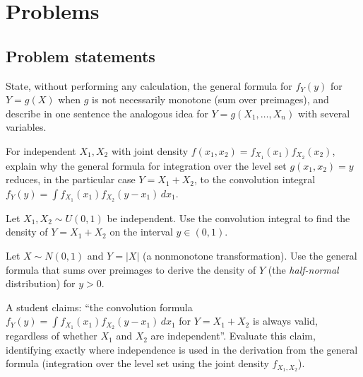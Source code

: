 \section*{Problems}

\subsection*{Problem statements}

\begin{problema}
	\label{prob:0b1575d}
	State, without performing any calculation, the general formula for $f_Y(y)$ for $Y=g(X)$ when $g$ is not necessarily monotone (sum over preimages), and describe in one sentence the analogous idea for $Y=g(X_1,\ldots,X_n)$ with several variables.
\end{problema}

\begin{problema}
	\label{prob:a8b056e}
	For independent $X_1,X_2$ with joint density $f(x_1,x_2)=f_{X_1}(x_1)f_{X_2}(x_2)$, explain why the general formula for integration over the level set $g(x_1,x_2)=y$ reduces, in the particular case $Y=X_1+X_2$, to the convolution integral $f_Y(y)=\int f_{X_1}(x_1)f_{X_2}(y-x_1)\,dx_1$.
\end{problema}

\begin{problema}
	\label{prob:4cdd21e}
	Let $X_1,X_2 \sim U(0,1)$ be independent. Use the convolution integral to find the density of $Y=X_1+X_2$ on the interval $y\in(0,1)$.
\end{problema}

\begin{problema}
	\label{prob:43a7344}
	Let $X\sim N(0,1)$ and $Y=|X|$ (a nonmonotone transformation). Use the general formula that sums over preimages to derive the density of $Y$ (the \emph{half-normal} distribution) for $y>0$.
\end{problema}

\begin{problema}
	\label{prob:df21aa1}
	A student claims: ``the convolution formula $f_Y(y)=\int f_{X_1}(x_1)f_{X_2}(y-x_1)\,dx_1$ for $Y=X_1+X_2$ is always valid, regardless of whether $X_1$ and $X_2$ are independent''. Evaluate this claim, identifying exactly where independence is used in the derivation from the general formula (integration over the level set using the joint density $f_{X_1,X_2}$).
\end{problema}

